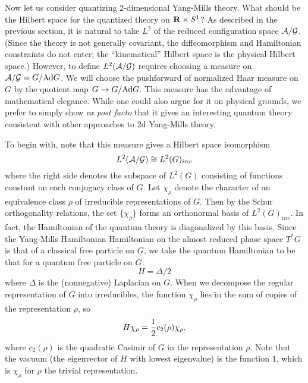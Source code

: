 \documentclass[12pt]{article}
\newcommand{\ba}{\begin{eqnarray}}
\newcommand{\ea}{\end{eqnarray}}
\newcommand{\A}{{\cal A}}
\newcommand{\G}{{\cal G}}
\newcommand{\R}{{\bf R}}
\newcommand{\hf}{{1\over 2}}
\newcommand{\Ad}{{\rm Ad}}
\begin{document}
Now let us consider quantizing 2-dimensional Yang-Mills theory.
What should be the Hilbert space for the quantized theory on
$\R \times S^1$?   As described in the previous section, it is natural to
take $L^2$ of the reduced configuration space $\A/\G$.  (Since the theory
is not generally covariant, the diffeomorphism and Hamiltonian constraints
do not enter; the ``kinematical'' Hilbert space is the physical Hilbert
space.)  However, to define $L^2(\A/\G)$ requires
choosing a measure on $\A/\G = G/\Ad G$.   We will choose the
pushforward of normalized Haar measure on $G$ by the quotient map $G \to
G/\Ad G$.  This measure has the advantage of mathematical elegance.
While one could also argue for it on physical grounds, we prefer to
simply show {\it ex post facto} that it gives an interesting quantum theory
consistent with other approaches to 2d Yang-Mills theory.

To begin with, note that this measure gives a Hilbert space isomorphism
\[        L^2(\A/\G) \cong L^2(G)_{inv} \]
where the right side denotes the subspace of $L^2(G)$ consisting of
functions constant on each conjugacy class of $G$.   Let $\chi_\rho$ denote
the character of an equivalence class $\rho$ of irreducible representations
of $G$.   Then by the Schur orthogonality relations, the set
$\{\chi_\rho\}$ forms an orthonormal basis of $L^2(G)_{inv}$. In fact, the
Hamiltonian of the quantum theory is diagonalized by this basis.   Since
the Yang-Mills Hamiltonian Hamiltonian on the almost reduced phase space
$T^\ast G$ is that of a classical free particle on $G$,  we take the
quantum Hamiltonian to be that for a quantum free particle on $G$:
\[        H = \Delta/2  \]
where $\Delta$ is the (nonnegative) Laplacian on $G$.
When we decompose the regular representation of $G$ into irreducibles,  the
function $\chi_\rho$ lies in the sum of copies of the representation
$\rho$, so
\ba              H\chi_\rho = \hf c_2(\rho) \chi_\rho ,\label{Ham0} \ea
where $c_2(\rho)$ is the quadratic Casimir of $G$ in the
representation $\rho$. Note that the vacuum (the eigenvector of $H$ with
lowest eigenvalue) is the function $1$, which is $\chi_\rho$ for $\rho$ the
trivial representation.
\end{document}
